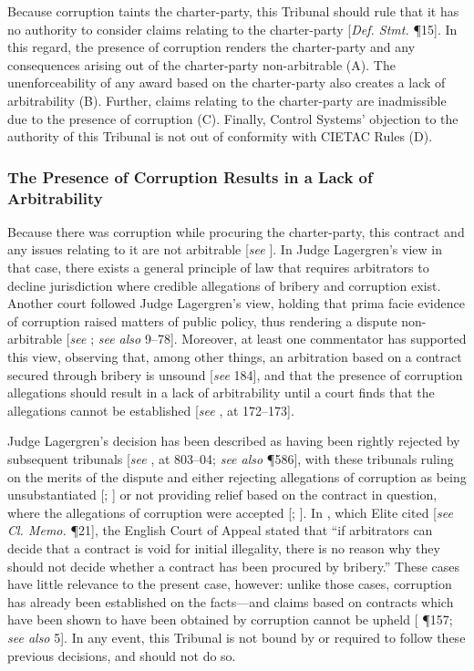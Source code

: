 Because corruption taints the charter-party, this Tribunal should rule that it has no authority to consider claims relating to the charter-party [\textit{Def. Stmt.} \P15]. In this regard, the presence of corruption renders the charter-party and any consequences arising out of the charter-party non-arbitrable (A). The unenforceability of any award based on the charter-party also creates a lack of arbitrability (B). Further, claims relating to the charter-party are inadmissible due to the presence of corruption (C). Finally, Control Systems' objection to the authority of this Tribunal is not out of conformity with CIETAC Rules (D).

\subsubsection{The Presence of Corruption Results in a Lack of Arbitrability} 

Because there was corruption while procuring the charter-party, this contract and any issues relating to it are not arbitrable [\textit{see} \cite{ICC Case No. 1110}]. In Judge Lagergren's view in that case, there exists a general principle of law that requires arbitrators to decline jurisdiction where credible allegations of bribery and corruption exist. Another court followed Judge Lagergren's view, holding that prima facie evidence of corruption raised matters of public policy, thus rendering a dispute non-arbitrable [\textit{see} \cite{HUBCO v. WAPDA}; \textit{see also} \cite{Lew et al.} 9--78]. Moreover, at least one commentator has supported this view, observing that, among other things, an arbitration based on a contract secured through bribery is unsound [\textit{see} \cite{Sornarajah 2000} 184], and that the presence of corruption allegations should result in a lack of arbitrability until a court finds that the allegations cannot be established [\textit{see} \cite{Sornarajah 1990}, at 172--173].

Judge Lagergren's decision has been described as having been rightly rejected by subsequent tribunals [\textit{see} \cite{Born 2009}, at 803--04; \textit{see also} \cite{Fouchard Gaillard Goldman} \P 586], with these tribunals ruling on the merits of the dispute and either rejecting allegations of corruption as being unsubstantiated [\seeeg \cite{ICC Case No. 4145}; \seeeg \cite{ICC Case No. 6286}] or not providing relief based on the contract in question, where the allegations of corruption were accepted [\seeeg \cite{ICC Case No. 6248}; \seeeg \cite{ICC Case No. 6497}]. In \cite{Fiona Trust-Holding Corp.}, which Elite cited [\textit{see} \textit{Cl. Memo.} \P 21], the English Court of Appeal stated that ``if arbitrators can decide that a contract is void for initial illegality, there is no reason why they should not decide whether a contract has been procured by bribery.'' These cases have little relevance to the present case, however: unlike those cases, corruption has already been established on the facts---and claims based on contracts which have been shown to have been obtained by corruption cannot be upheld [\cite{World Duty Free Case} \P 157; \textit{see also} \cite{Siag & Vecchi} 5]. In any event, this Tribunal is not bound by or required to follow these previous decisions, and should not do so. 


